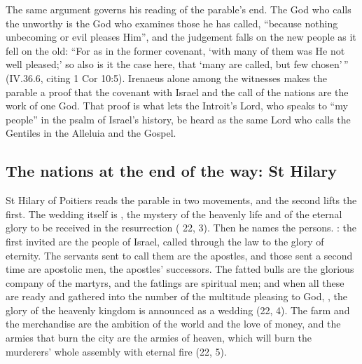The same argument governs his reading of the parable's end. The God who calls
the unworthy is the God who examines those he has called, ``because nothing
unbecoming or evil pleases Him'', and the judgement falls on the new people as
it fell on the old: ``For as in the former covenant, `with many of them was He
not well pleased;' so also is it the case here, that `many are called, but few
chosen'\,'' (IV.36.6, citing 1 Cor 10:5). Irenaeus alone among the witnesses
makes the parable a proof that the covenant with Israel and the call of the
nations are the work of one God. That proof is what lets the Introit's Lord,
who speaks to ``my people'' in the psalm of Israel's history, be heard as the
same Lord who calls the Gentiles in the Alleluia and the Gospel.

\subsection{The nations at the end of the way: St Hilary}

St Hilary of Poitiers reads the parable in two movements, and the second lifts
the first. The wedding itself is , the mystery of the heavenly life and
of the eternal glory to be received in the resurrection ( 22, 3). Then he names the persons. : the first
invited are the people of Israel, called through the law to the glory of
eternity. The servants sent to call them are the apostles, and those sent a
second time  are apostolic men, the
apostles' successors. The fatted bulls are the glorious company of the martyrs,
and the fatlings are spiritual men; and when all these are ready and gathered
into the number of the multitude pleasing to God, , the glory of the heavenly kingdom is announced as
a wedding (22, 4). The farm and the merchandise are the ambition of the world
and the love of money, and the armies that burn the city are the armies of
heaven, which will burn the murderers' whole assembly with eternal fire
(22, 5).

